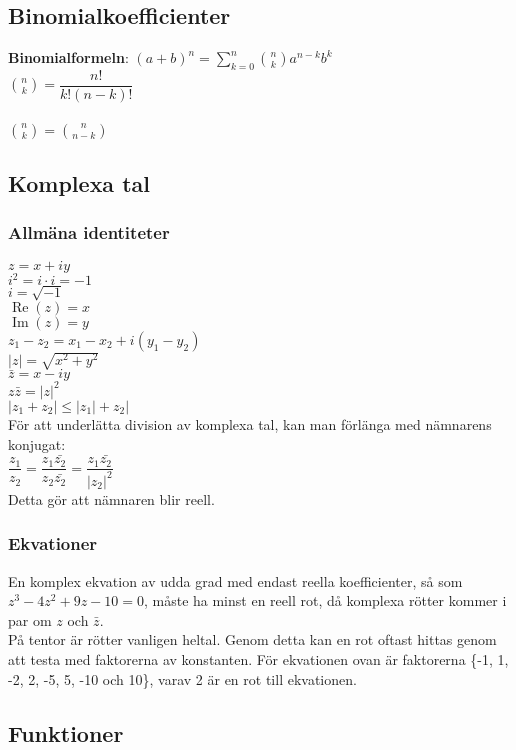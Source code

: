 \documentclass{article}
\DeclareMathOperator{\re}{Re}
\DeclareMathOperator{\im}{Im}
\begin{document}
\subsection{Binomialkoefficienter}
\textbf{Binomialformeln}: $(a + b)^n = \sum\limits_{k=0}^n \binom{n}{k}a^{n-k}b^k$\\
$\binom{n}{k} = \dfrac{n!}{k!(n-k)!}$\\
\\
$\binom{n}{k} = \binom{n}{n-k}$
\subsection{Komplexa tal}
\subsubsection{Allmäna identiteter}

\begin{doublespace}
$z = x + iy$ \\ $i^2 = i \cdot i = -1$ \\ $i = \sqrt{-1}$ \\ $\re(z) = x$ \\ $\im(z) = y$ \\
$z_1 - z_2 = x_1 - x_2 + i(y_1 - y_2)$ \\
$|z| = \sqrt{x^2 + y^2}$ \\
$\bar{z} = x - iy$ \\
$z\bar{z} = |z|^2$ \\
$|z_1 + z_2| \leq |z_1| + z_2|$ \\
För att underlätta division av komplexa tal, kan man förlänga med nämnarens konjugat:\\
$\dfrac{z_1}{z_2} = \dfrac{z_1\bar{z_2}}{z_2\bar{z_2}} = \dfrac{z_1\bar{z_2}}{|z_2|^2}$ \\
Detta gör att nämnaren blir reell.
\subsubsection{Ekvationer}
En komplex ekvation av udda grad med endast reella koefficienter, så som $z^3 - 4z^2 + 9z - 10 = 0$, måste ha minst en reell rot, då komplexa rötter kommer i par om $z$ och $\bar{z}$.\\
På tentor är rötter vanligen heltal. Genom detta kan en rot oftast hittas genom att testa med faktorerna av konstanten. För ekvationen ovan är faktorerna \{-1, 1, -2, 2, -5, 5, -10 och 10\}, varav 2 är en rot till ekvationen.
\end{doublespace}
\subsection{Funktioner}
\end{document}
